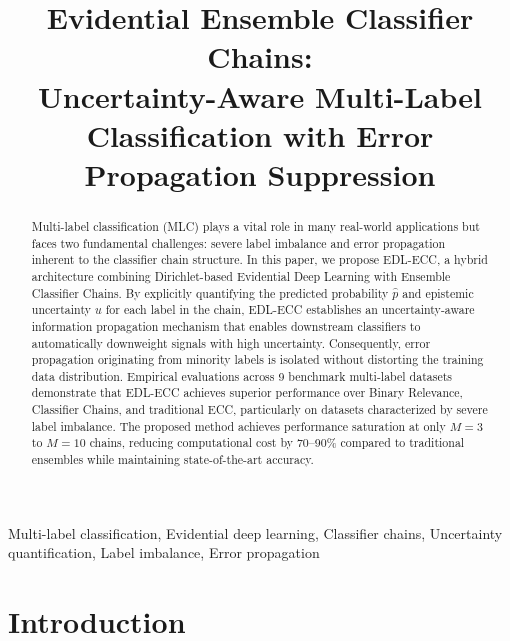 \documentclass[conference]{IEEEtran}
\begin{document}
\title{Evidential Ensemble Classifier Chains:\\
Uncertainty-Aware Multi-Label Classification with Error Propagation Suppression}

\author{
}

\maketitle

\begin{abstract}
Multi-label classification (MLC) plays a vital role in many real-world applications but faces two fundamental challenges: severe label imbalance and error propagation inherent to the classifier chain structure. In this paper, we propose EDL-ECC, a hybrid architecture combining Dirichlet-based Evidential Deep Learning with Ensemble Classifier Chains. By explicitly quantifying the predicted probability $\hat{p}$ and epistemic uncertainty $u$ for each label in the chain, EDL-ECC establishes an uncertainty-aware information propagation mechanism that enables downstream classifiers to automatically downweight signals with high uncertainty. Consequently, error propagation originating from minority labels is isolated without distorting the training data distribution. Empirical evaluations across 9 benchmark multi-label datasets demonstrate that EDL-ECC achieves superior performance over Binary Relevance, Classifier Chains, and traditional ECC, particularly on datasets characterized by severe label imbalance. The proposed method achieves performance saturation at only $M=3$ to $M=10$ chains, reducing computational cost by 70--90\% compared to traditional ensembles while maintaining state-of-the-art accuracy.
\end{abstract}

\begin{IEEEkeywords}
Multi-label classification, Evidential deep learning, Classifier chains, Uncertainty quantification, Label imbalance, Error propagation
\end{IEEEkeywords}

\section{Introduction}
\end{document}
